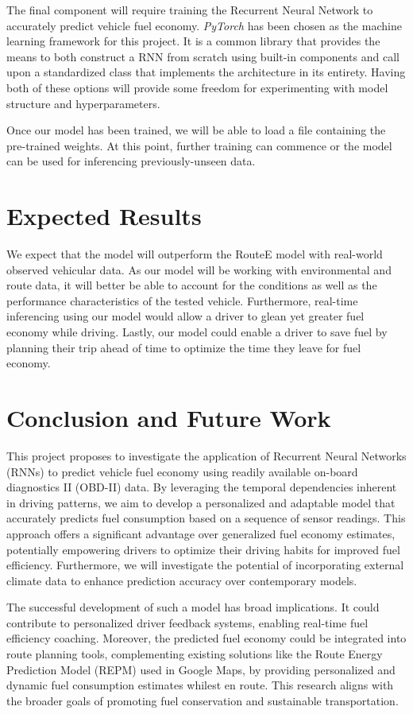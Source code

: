 \documentclass[letterpaper]{article}
\begin{document}
The final component will require training the Recurrent Neural Network to accurately predict vehicle fuel economy.
\emph{PyTorch} has been chosen as the machine learning framework for this project. It is a common library that
provides the means to both construct a RNN from scratch using built-in components and call upon a standardized class
that implements the architecture in its entirety. Having both of these options will provide some freedom for
experimenting with model structure and hyperparameters.

Once our model has been trained, we will be able to load a file containing the pre-trained weights. At this point,
further training can commence or the model can be used for inferencing previously-unseen data.



\section{Expected Results}

We expect that the model will outperform the RouteE model with real-world observed vehicular data. 
As our model will be working with environmental and route data, 
it will better be able to account for the conditions as well as the performance characteristics of the tested vehicle.
Furthermore, real-time inferencing using our model would allow a driver to glean yet greater fuel economy while driving.
Lastly, our model could enable a driver to save fuel by planning their trip ahead of time to optimize the time they leave for fuel economy.

\section{Conclusion and Future Work}

This project proposes to investigate the application of Recurrent Neural Networks (RNNs) to predict vehicle fuel economy using readily available on-board diagnostics II (OBD-II) data. 
By leveraging the temporal dependencies inherent in driving patterns, 
we aim to develop a personalized and adaptable model that accurately predicts fuel consumption based on a sequence of sensor readings. 
This approach offers a significant advantage over generalized fuel economy estimates, 
potentially empowering drivers to optimize their driving habits for improved fuel efficiency. 
Furthermore, we will investigate the potential of incorporating external climate data to enhance prediction accuracy over contemporary models.

The successful development of such a model has broad implications. 
It could contribute to personalized driver feedback systems, 
enabling real-time fuel efficiency coaching. 
Moreover, the predicted fuel economy could be integrated into route planning tools, 
complementing existing solutions like the Route Energy Prediction Model (REPM) used in Google Maps, 
by providing personalized and dynamic fuel consumption estimates whilest en route. 
This research aligns with the broader goals of promoting fuel conservation and sustainable transportation.

 

\end{document}
